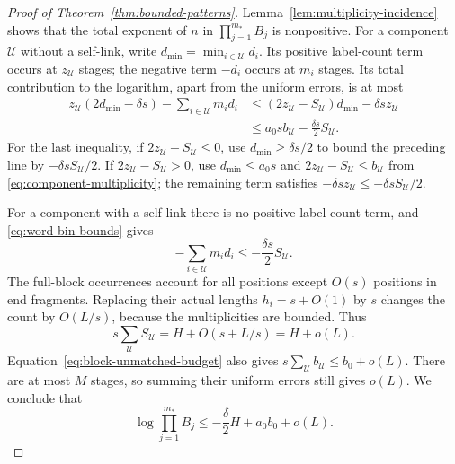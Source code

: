 \begin{proof}[Proof of Theorem~\ref{thm:bounded-patterns}]
Lemma~\ref{lem:multiplicity-incidence} shows that the total exponent of
$n$ in $\prod_{j=1}^{m_*}B_j$ is nonpositive. For a component
$\mathcal U$ without a self-link, write
$d_{\min}=\min_{i\in\mathcal U}d_i$.  Its positive label-count term
occurs at $z_{\mathcal U}$ stages; the negative term $-d_i$ occurs at
$m_i$ stages.  Its total contribution to the logarithm, apart from
the uniform errors, is at most
\begin{align*}
 z_{\mathcal U}(2d_{\min}-\delta s)
       -\sum_{i\in\mathcal U}m_i d_i
 &\leq (2z_{\mathcal U}-S_{\mathcal U})d_{\min}
                -\delta s z_{\mathcal U}\\
 &\leq a_0s b_{\mathcal U}
                -\frac{\delta s}{2}S_{\mathcal U}.
\end{align*}
For the last inequality, if $2z_{\mathcal U}-S_{\mathcal U}\leq0$,
use $d_{\min}\geq\delta s/2$ to bound the preceding line by
$-\delta s S_{\mathcal U}/2$.  If
$2z_{\mathcal U}-S_{\mathcal U}>0$, use
$d_{\min}\leq a_0s$ and
$2z_{\mathcal U}-S_{\mathcal U}\leq b_{\mathcal U}$ from
\eqref{eq:component-multiplicity}; the remaining term satisfies
$-\delta s z_{\mathcal U}\leq-\delta s S_{\mathcal U}/2$.

For a component with a self-link there is no positive label-count
term, and \eqref{eq:word-bin-bounds} gives
\[
 -\sum_{i\in\mathcal U}m_i d_i
 \leq-\frac{\delta s}{2}S_{\mathcal U}.
\]
The full-block occurrences account for all positions except $O(s)$
positions in end fragments.  Replacing their actual lengths
$h_i=s+O(1)$ by $s$ changes the count by $O(L/s)$, because the
multiplicities are bounded.  Thus
\[
 s\sum_{\mathcal U}S_{\mathcal U}=H+O(s+L/s)=H+o(L).
\]
Equation~\eqref{eq:block-unmatched-budget} also gives
$s\sum_{\mathcal U}b_{\mathcal U}\leq b_0+o(L)$.
There are at most $M$ stages, so summing their uniform errors still
gives $o(L)$.  We conclude that
\begin{equation}\label{eq:stage-product}
 \log\prod_{j=1}^{m_*}B_j
 \leq-\frac\delta2 H+a_0b_0+o(L).
\end{equation}


\end{proof}
